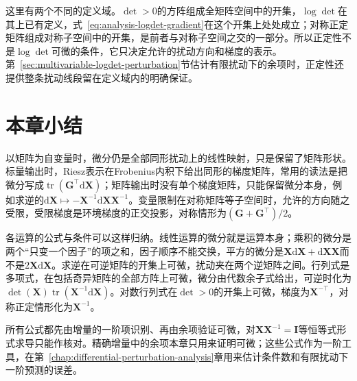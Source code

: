 这里有两个不同的定义域。$\det>0$的方阵组成全矩阵空间中的开集，$\log\det$在其上已有定义，式~\eqref{eq:analysis-logdet-gradient}在这个开集上处处成立；对称正定矩阵组成对称子空间中的开集，是前者与对称子空间之交的一部分。所以正定性不是$\log\det$可微的条件，它只决定允许的扰动方向和梯度的表示。第~\ref{sec:multivariable-logdet-perturbation}节估计有限扰动下的余项时，正定性还提供整条扰动线段留在定义域内的明确保证。

\FloatBarrier
\section{本章小结}
\label{sec:matrix-differentiation-summary}

以矩阵为自变量时，微分仍是全部同形扰动上的线性映射，只是保留了矩阵形状。标量输出时，Riesz表示在Frobenius内积下给出同形的梯度矩阵，常用的读法是把微分写成$\operatorname{tr}(\bm G^\top\mathrm d\bm X)$；矩阵输出时没有单个梯度矩阵，只能保留微分本身，例如求逆的$\mathrm d\bm X\mapsto-\bm X^{-1}\mathrm d\bm X\bm X^{-1}$。变量限制在对称矩阵等子空间时，允许的方向随之受限，受限梯度是环境梯度的正交投影，对称情形为$(\bm G+\bm G^\top)/2$。

各运算的公式与条件可以这样归纳。线性运算的微分就是运算本身；乘积的微分是两个“只变一个因子”的项之和，因子顺序不能交换，平方的微分是$\bm X\mathrm d\bm X+\mathrm d\bm X\bm X$而不是$2\bm X\mathrm d\bm X$。求逆在可逆矩阵的开集上可微，扰动夹在两个逆矩阵之间。行列式是多项式，在包括奇异矩阵的全部方阵上可微，微分由代数余子式给出，可逆时化为$\det(\bm X)\operatorname{tr}(\bm X^{-1}\mathrm d\bm X)$。对数行列式在$\det>0$的开集上可微，梯度为$\bm X^{-\top}$，对称正定情形化为$\bm X^{-1}$。

所有公式都先由增量的一阶项识别、再由余项验证可微，对$\bm X\bm X^{-1}=\bm I$等恒等式形式求导只能作核对。精确增量中的余项本章只用来证明可微；这些公式作为一阶工具，在第~\ref{chap:differential-perturbation-analysis}章用来估计条件数和有限扰动下一阶预测的误差。
